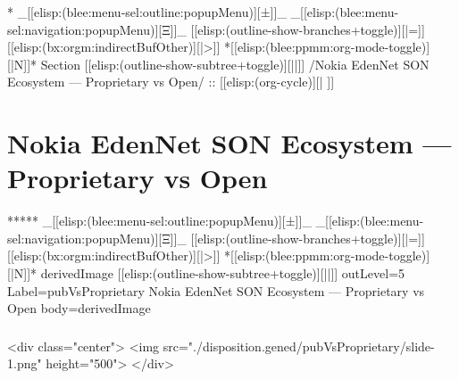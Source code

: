 


\begin{whenOrg}
*  _[[elisp:(blee:menu-sel:outline:popupMenu)][±]]_ _[[elisp:(blee:menu-sel:navigation:popupMenu)][Ξ]]_ [[elisp:(outline-show-branches+toggle)][|=]] [[elisp:(bx:orgm:indirectBufOther)][|>]] *[[elisp:(blee:ppmm:org-mode-toggle)][|N]]*  Section    [[elisp:(outline-show-subtree+toggle)][||]]   /Nokia EdenNet SON Ecosystem --- Proprietary vs Open/ ::  [[elisp:(org-cycle)][| ]]
\end{whenOrg}

\section{Nokia EdenNet SON Ecosystem --- Proprietary vs Open}

\begin{whenOrg}
*****  _[[elisp:(blee:menu-sel:outline:popupMenu)][±]]_ _[[elisp:(blee:menu-sel:navigation:popupMenu)][Ξ]]_ [[elisp:(outline-show-branches+toggle)][|=]] [[elisp:(bx:orgm:indirectBufOther)][|>]] *[[elisp:(blee:ppmm:org-mode-toggle)][|N]]*  derivedImage [[elisp:(outline-show-subtree+toggle)][||]] outLevel=5 Label=pubVsProprietary Nokia EdenNet SON Ecosystem --- Proprietary vs Open body=derivedImage

\end{whenOrg}

\begin{htmlonly}

\begin{frame}[fragile,plain,label=pubVsProprietary]
    \frametitle{}
    \framesubtitle{}
    \begin{rawhtml}
<div class="center">
<img src="./disposition.gened/pubVsProprietary/slide-1.png" height="500">
</div>
    \end{rawhtml}
\end{frame}
\end{htmlonly}

